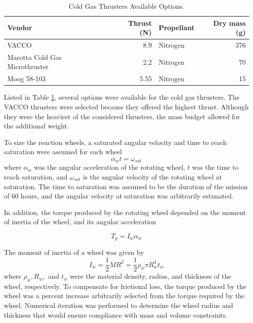 \documentclass[paper=letter, fontsize=11pt]{scrartcl} %
\numberwithin{equation}{section} %
\numberwithin{figure}{section} %
\numberwithin{table}{section} %
\begin{document}
\begin{table}[htb]
\centering
\begin{tabular}{l r l r}
\toprule
Vendor & Thrust (N) & Propellant & Dry mass (g)\\
\midrule
VACCO~\cite{cold_gas_thruster}              & 8.9 	& Nitrogen      &  376 \\
Marotta Cold Gas Microthruster~\cite{cold_gas2} & 2.2 	& Nitrogen	& 70 	\\
Moog 58-103~\cite{space_props}				& 5.55	& Nitrogen	& 15 	\\
\bottomrule
\end{tabular}
\caption{Cold Gas Thrusters Available Options.}
\label{table:cgta}
\end{table}

\par Listed in Table \ref{table:cgta}, several options were available for the cold gas thrusters. The VACCO thrusters were selected because they offered the highest thrust. Although they were the heaviest of the considered thrusters, the mass budget allowed for the additional weight.

\par To size the reaction wheels, a saturated angular velocity and time to reach saturation were assumed for each wheel
\begin{equation*}
\alpha_w t = \omega_{sat}
\label{equation:alphasat}
\end{equation*}
where $\alpha_w$ was the angular acceleration of the rotating wheel, $t$ was the time to reach saturation, and $\omega_{sat}$ is the angular velocity of the rotating wheel at saturation. The time to saturation was assumed to be the duration of the mission of 60 hours, and the angular velocity at saturation was arbitrarily estimated.

In addition, the torque produced by the rotating wheel depended on the moment of inertia of the wheel, and its angular acceleration

\begin{equation*}
T_p = I_w \alpha_w
\label{equation:tp}
\end{equation*}

The moment of inertia of a wheel was given by
\begin{equation*}
I_w = \frac{1}{2}MR^{2}=\frac{1}{2} \rho_{w} \pi R_{w}^{4} t_{w}
\label{equation:iw}
\end{equation*}
where $\rho_{w}, R_{w},$ and $t_{w}$ were the material density, radius, and thickness of the wheel, respectively. To compensate for frictional loss, the torque produced by the wheel was a percent increase arbitrarily selected from the torque required by the wheel. Numerical iteration was performed to determine the wheel radius and thickness that would ensure compliance with mass and volume constraints.
\end{document}
